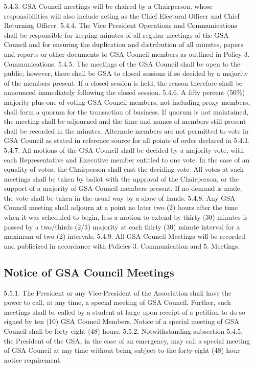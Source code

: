 \documentclass{article}
\begin{document}
5.4.3. GSA Council meetings will be chaired by a Chairperson, whose 
responsibilities will also include acting as the Chief Electoral Officer 
and Chief Returning Officer. 
5.4.4. The Vice President Operations and Communications shall be 
responsible for keeping minutes of all regular meetings of the GSA 
Council and for ensuring the duplication and distribution of all 
minutes, papers and reports or other documents to GSA Council 
members as outlined in Policy 3. Communications. 
5.4.5. The meetings of the GSA Council shall be open to the public; 
however, there shall be GSA to closed sessions if so decided by a 
majority of the members present. If a closed session is held, the reason 
therefore shall be announced immediately following the closed 
session. 
5.4.6. A fifty percent (50\%) majority plus one of voting GSA Council 
members, not including proxy members, shall form a quorum for the 
transaction of business. If quorum is not maintained, the meeting shall 
be adjourned and the time and names of members still present shall be 
recorded in the minutes. Alternate members are not permitted to vote 
in GSA Council as stated in reference source for all points of order 
declared in 5.4.1. 
5.4.7. All motions of the GSA Council shall be decided by a majority vote, 
with each Representative and Executive member entitled to one vote. 
In the case of an equality of votes, the Chairperson shall cast the 
deciding vote. All votes at such meetings shall be taken by ballot with 
the approval of the Chairperson, or the support of a majority of GSA 
Council members present. If no demand is made, the vote shall be 
taken in the usual way by a show of hands. 
5.4.8. Any GSA Council meeting shall adjourn at a point no later two (2) 
hours after the time when it was scheduled to begin, less a motion to 
extend by thirty (30) minutes is passed by a two/thirds (2/3) majority 
at each thirty (30) minute interval for a maximum of two (2) intervals. 
5.4.9. All GSA Council Meetings will be recorded and publicized in accordance with Policies 3. Communication and 5. Meetings. 
\subsection{Notice of GSA Council Meetings }
5.5.1. The President or any Vice-President of the Association shall have the 
power to call, at any time, a special meeting of GSA Council. Further, 
such meetings shall be called by a student at large upon receipt of a 
petition to do so signed by ten (10) GSA Council Members. Notice of 
a special meeting of GSA Council shall be forty-eight (48) hours. 
5.5.2. Notwithstanding subsection 5.4.5, the President of the GSA, in the 
case of an emergency, may call a special meeting of GSA Council at 
any time without being subject to the forty-eight (48) hour notice 
requirement. 
\end{document}
